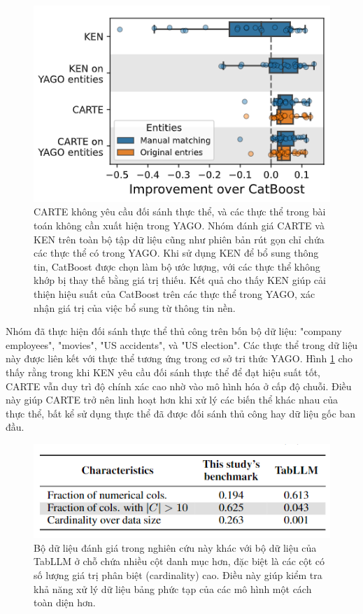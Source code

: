 \documentclass{article}
\begin{document}
\begin{figure} 
    \centering
    \includegraphics[scale = 0.8]{carte_entity_matching_not_required.png}
    \caption{CARTE không yêu cầu đối sánh thực thể, và các thực thể trong bài toán không cần xuất hiện trong YAGO. Nhóm đánh giá CARTE và KEN trên toàn bộ tập dữ liệu cũng như phiên bản rút gọn chỉ chứa các thực thể có trong YAGO. Khi sử dụng KEN để bổ sung thông tin, CatBoost được chọn làm bộ ước lượng, với các thực thể không khớp bị thay thế bằng giá trị thiếu. Kết quả cho thấy KEN giúp cải thiện hiệu suất của CatBoost trên các thực thể trong YAGO, xác nhận giá trị của việc bổ sung từ thông tin nền.}
    \label{fig:carte_entity_matching_not_required}
\end{figure}

Nhóm đã thực hiện đối sánh thực thể thủ công trên bốn bộ dữ liệu: "company employees", "movies", "US accidents", và "US election". Các thực thể trong dữ liệu này được liên kết với thực thể tương ứng trong cơ sở tri thức YAGO. Hình \ref{fig:carte_entity_matching_not_required} cho thấy rằng trong khi KEN yêu cầu đối sánh thực thể để đạt hiệu suất tốt, CARTE vẫn duy trì độ chính xác cao nhờ vào mô hình hóa ở cấp độ chuỗi. Điều này giúp CARTE trở nên linh hoạt hơn khi xử lý các biến thể khác nhau của thực thể, bất kể sử dụng thực thể đã được đối sánh thủ công hay dữ liệu gốc ban đầu. 

\begin{figure} 
    \centering
    \includegraphics[scale = 0.8]{carte_vs_tabllm_dataset.png}
    \caption{Bộ dữ liệu đánh giá trong nghiên cứu này khác với bộ dữ liệu của TabLLM ở chỗ chứa nhiều cột danh mục hơn, đặc biệt là các cột có số lượng giá trị phân biệt (cardinality) cao. Điều này giúp kiểm tra khả năng xử lý dữ liệu bảng phức tạp của các mô hình một cách toàn diện hơn.}
    \label{fig:carte_vs_tabllm_dataset}
\end{figure}
\end{document}
